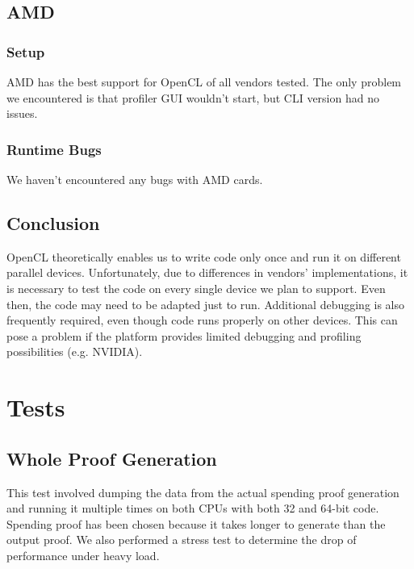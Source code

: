 \subsection{AMD}
\subsubsection{Setup}
AMD has the best support for OpenCL of all vendors tested. The only problem we encountered is that profiler GUI wouldn't start, but CLI version had no issues.
\subsubsection{Runtime Bugs}
We haven't encountered any bugs with AMD cards.

\subsection{Conclusion}

OpenCL theoretically enables us to write code only once and run it on different parallel devices. Unfortunately, due to differences in vendors' implementations, it is necessary to test the code on every single device we plan to support. Even then, the code may need to be adapted just to run. Additional debugging is also frequently required, even though code runs properly on other devices. This can pose a problem if the platform provides limited debugging and profiling possibilities (e.g. NVIDIA).

\section{Tests}

\subsection{Whole Proof Generation}

This test involved dumping the data from the actual spending proof generation and running it multiple times on both CPUs with both 32 and 64-bit code. Spending proof has been chosen because it takes longer to generate than the output proof. We also performed a stress test to determine the drop of performance under heavy load.

